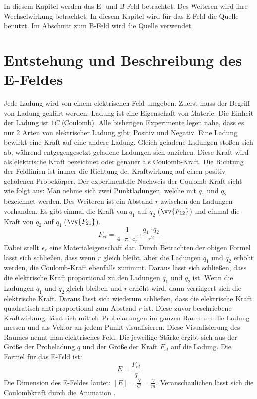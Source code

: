 In diesem Kapitel werden das E- und B-Feld betrachtet.
Des Weiteren wird ihre Wechselwirkung betrachtet.
In diesem Kapitel wird für das E-Feld die Quelle \cite{Animation} benutzt.
Im Abschnitt zum B-Feld wird die Quelle \cite{Lorentzkraft} verwendet.
\section{Entstehung und Beschreibung des E-Feldes}
Jede Ladung wird von einem elektrischen Feld umgeben.
Zuerst muss der Begriff von Ladung geklärt werden:
Ladung ist eine Eigenschaft von Materie.
Die Einheit der Ladung ist $1C$ (Coulomb).
Alle bisherigen Experimente legen nahe, dass es nur 2 Arten von elektrischer Ladung gibt; Positiv und Negativ.
Eine Ladung bewirkt eine Kraft auf eine andere Ladung.
Gleich geladene Ladungen stoßen sich ab, während entgegengesetzt geladene Ladungen sich anziehen.
Diese Kraft wird als elektrische Kraft bezeichnet oder genauer als Coulomb-Kraft.
Die Richtung der Feldlinien ist immer die Richtung der Kraftwirkung auf einen positiv geladenen Probekörper.
Der experimentelle Nachweis der Coulomb-Kraft sieht wie folgt aus:
Man nehme sich zwei Punktladungen, welche mit $q_1$ und $q_2$ bezeichnet werden. 
Des Weiteren ist ein Abstand $r$ zwischen den Ladungen vorhanden.
Es gibt einmal die Kraft von $q_1$ auf $q_2$ ($\vv{F_{12}}$) und einmal die Kraft von $q_2$ auf $q_1$ ($\vv{F_{21}}$).
\begin{equation*}
   F_{el} = \frac{1}{4 \cdot \pi \cdot \epsilon_r} \cdot \frac{q_1 \cdot q_2}{r^2}    
\end{equation*}
Dabei stellt $\epsilon_r$ eine Materialeigenschaft dar.
Durch Betrachten der obigen Formel lässt sich schließen, dass wenn $r$ gleich bleibt, aber die Ladungen $q_1$ und $q_2$ erhöht werden, die Coulomb-Kraft ebenfalls zunimmt.
Daraus lässt sich schließen, dass die elektrische Kraft proportional zu den Ladungen $q_1$ und $q_2$ ist. 
Wenn die Ladungen $q_1$ und $q_2$ gleich bleiben und $r$ erhöht wird, dann verringert sich die elektrische Kraft.
Daraus lässt sich wiederum schließen, dass die elektrische Kraft quadratisch anti-proportional zum Abstand $r$ ist.
Diese zuvor beschriebene Kraftwirkung, lässt sich mittels Probeladungen im ganzen Raum um die Ladung messen und als Vektor an jedem Punkt visualisieren.
Diese Visualisierung des Raumes nennt man elektrisches Feld.
Die jeweilige Stärke ergibt sich aus der Größe der Probeladung $q$ und der Größe der Kraft $F_{el}$ auf die Ladung.
Die Formel für das E-Feld ist:
\begin{equation*}
    E = \frac{F_{el}}{q}
\end{equation*}
Die Dimension des E-Feldes lautet: $[E] = \frac{N}{C} = \frac{V}{m}$.
Veranschaulichen lässt sich die Coulombkraft durch die Animation \cite{Animation}.

